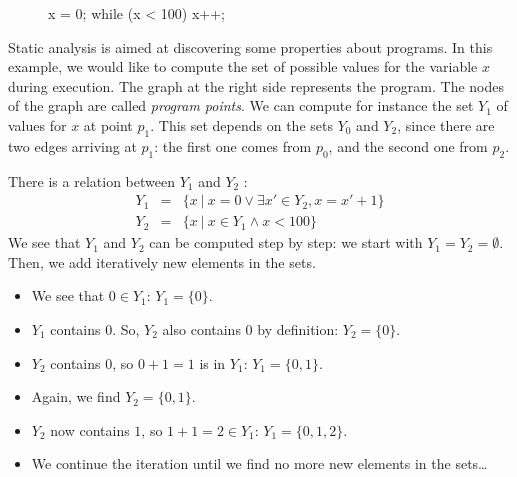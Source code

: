 \documentclass[a4paper,english,titlepage,11pt]{report}
\begin{document}
\begin{figure}[!h]
   \begin{minipage}[c]{.46\linewidth}
\begin{C}
x = 0;
while (x < 100) {
	x++;
}
\end{C}
   \end{minipage} \hfill
   \begin{minipage}[c]{.46\linewidth}
   \end{minipage}
\end{figure}
\FloatBarrier

Static analysis is aimed at discovering some properties about programs. In this
example, we would like to compute the set of possible values for the variable $x$ during execution.
The graph at the right side represents the program. The nodes of the graph are
called \emph{program points}. We can compute for instance the set $Y_1$ of
values for $x$ at point $p_1$. This set depends on the sets $Y_0$ and $Y_2$,
since there are two edges arriving at $p_1$: the first one comes from $p_0$, and
the second one from $p_2$.

There is a relation between $Y_1$ and $Y_2$ :
\begin{eqnarray*}
Y_1 &=& \{x\ |\ x=0 \vee \exists x' \in Y_2, x=x'+1 \} \\
Y_2 &=& \{x\ |\ x \in Y_1 \wedge x < 100 \}
\end{eqnarray*}
We see that $Y_1$ and $Y_2$ can be computed step by step:
we start with $Y_1 = Y_2 = \emptyset$.
Then, we add iteratively new elements in the sets.
\begin{itemize}
\item  We see that $0 \in Y_1$: $Y_1 = \{0\}$.
\item $Y_1$ contains $0$. So, $Y_2$ also contains $0$ by definition: $Y_2 =
\{0\}$.
\item $Y_2$ contains $0$, so $0+1=1$ is in $Y_1$: $Y_1 = \{0,1\}$.
\item Again, we find $Y_2 = \{0,1\}$.
\item $Y_2$ now contains $1$, so $1+1=2 \in Y_1$: $Y_1 = \{0,1,2\}$.
\item We continue the iteration until we find no more new elements in the
sets\dots
\end{itemize}
\end{document}
